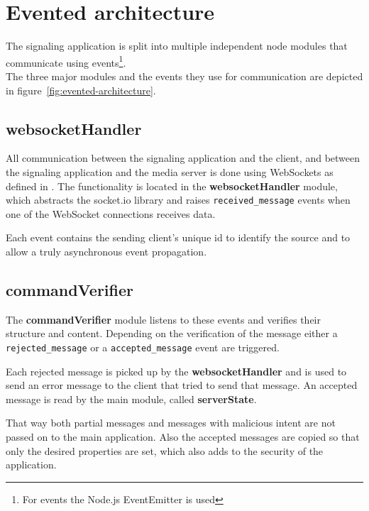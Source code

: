 \documentclass[../../../thesis.tex]{subfiles}
\begin{document}
\section{Evented architecture}
The signaling application is split into multiple independent node modules that communicate using events\footnote{For events the Node.js EventEmitter \cite[chapter 4]{node-upandrunning} is used}.\\
The three major modules and the events they use for communication are depicted in figure~\ref{fig:evented-architecture}\footnotemark.

\subsection{websocketHandler}
All communication between the signaling application and the client, and between the signaling application and the media server is done using WebSockets as defined in . The functionality is located in the \textbf{websocketHandler} module, which abstracts the socket.io\cite[chapter 4]{socket-io} library and raises \texttt{received\_message} events when one of the WebSocket connections receives data.\par
Each event contains the sending client's unique id to identify the source and to allow a truly asynchronous event propagation.

\subsection{commandVerifier}
The \textbf{commandVerifier} module listens to these events and verifies their structure and content. Depending on the verification of the message either a \texttt{rejected\_message} or a \texttt{accepted\_message} event are triggered.\par
Each rejected message is picked up by the \textbf{websocketHandler} and is used to send an error message to the client that tried to send that message. An accepted message is read by the main module, called \textbf{serverState}.\par
That way both partial messages and messages with malicious intent are not passed on to the main application. Also the accepted messages are copied so that only the desired properties are set, which also adds to the security of the application.
\end{document}
